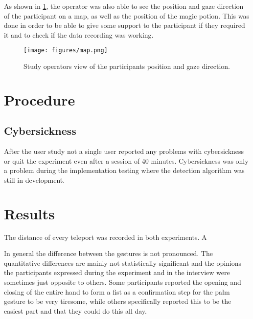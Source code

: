 As shown in \ref{fig:map}, the operator was also able to see the position and gaze direction of the participant on a map, as well as the position of the magic potion. This was done in order to be able to give some support to the participant if they required it and to check if the data recording was working. 

\begin{figure}[!ht]
    \centering
    \texttt{[image: figures/map.png]}
    \caption{Study operators view of the participants position and gaze direction.}
    \label{fig:map}
\end{figure}


\section{Procedure}




\subsection{Cybersickness}
After the user study not a single user reported any problems with cybersickness or quit the experiment even after a session of 40 minutes. Cybersickness was only a problem during the implementation testing where the detection algorithm was still in development.


\section{Results}


The distance of every teleport was recorded in both experiments. A 


In general the difference between the gestures is not pronounced. The quantitative differences are mainly not statistically significant and the opinions the participants expressed during the experiment and in the interview were sometimes just opposite to others. Some participants reported the opening and closing of the entire hand to form a fist as a confirmation step for the palm gesture to be very tiresome, while others specifically reported this to be the easiest part and that they could do this all day. 

